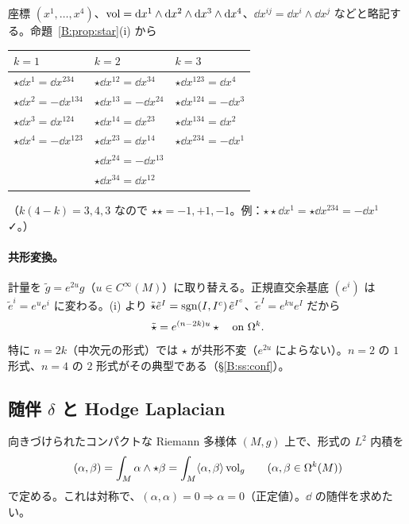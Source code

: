 \begin{ex}[$\R^4$ の Hodge 星]\label{B:ex:star4}
座標 $(x^1,\dots,x^4)$、$\mathrm{vol}=\mathrm{d} x^1\wedge\mathrm{d} x^2\wedge\mathrm{d} x^3\wedge\mathrm{d} x^4$、$\dd x^{ij}=\dd x^i\wedge\dd x^j$ などと略記する。命題~\ref{B:prop:star}(i) から
\begin{center}
\small
\begin{tabular}{@{}lll@{}}
\toprule
$k=1$ & $k=2$ & $k=3$ \\
\midrule
$\star\dd x^1=\dd x^{234}$ & $\star\dd x^{12}=\dd x^{34}$ & $\star\dd x^{123}=\dd x^4$ \\
$\star\dd x^2=-\dd x^{134}$ & $\star\dd x^{13}=-\dd x^{24}$ & $\star\dd x^{124}=-\dd x^3$ \\
$\star\dd x^3=\dd x^{124}$ & $\star\dd x^{14}=\dd x^{23}$ & $\star\dd x^{134}=\dd x^2$ \\
$\star\dd x^4=-\dd x^{123}$ & $\star\dd x^{23}=\dd x^{14}$ & $\star\dd x^{234}=-\dd x^1$ \\
 & $\star\dd x^{24}=-\dd x^{13}$ & \\
 & $\star\dd x^{34}=\dd x^{12}$ & \\
\bottomrule
\end{tabular}
\end{center}
（$k(4-k)=3,4,3$ なので $\star\star=-1,+1,-1$。例：$\star\star\dd x^1=\star\dd x^{234}=-\dd x^1$ ✓。）
\end{ex}

\paragraph{共形変換。}計量を $\tilde g=e^{2u}g$（$u\in C^\infty(M)$）に取り替える。正規直交余基底 $(e^i)$ は $\tilde e^i=e^ue^i$ に変わる。(i) より $\tilde\star\tilde e^I=\operatorname{sgn}(I,I^c)\,\tilde e^{I^c}$、$\tilde e^I=e^{ku}e^I$ だから
\begin{equation}\label{B:eq:starconf}
\tilde\star=e^{(n-2k)u}\star\quad\text{on }\Omega^k.
\end{equation}
特に $n=2k$（中次元の形式）では $\star$ が共形不変（$e^{2u}$ によらない）。$n=2$ の $1$ 形式、$n=4$ の $2$ 形式がその典型である（\S\ref{B:ss:conf}）。

\subsection{随伴 $\delta$ と Hodge Laplacian}\label{B:ss:delta}

向きづけられたコンパクトな Riemann 多様体 $(M,g)$ 上で、形式の $L^2$ 内積を
\[
(\alpha,\beta)=\int_M\alpha\wedge\star\beta=\int_M\langle\alpha,\beta\rangle\,\mathrm{vol}_g\qquad(\alpha,\beta\in\Omega^k(M))
\]
で定める。これは対称で、$(\alpha,\alpha)=0\Rightarrow\alpha=0$（正定値）。$\dd$ の随伴を求めたい。

